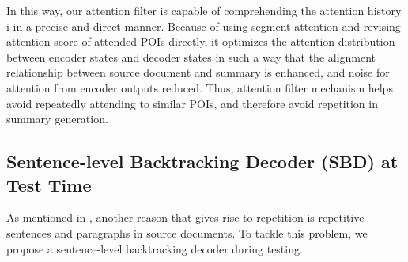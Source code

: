 
In this way, our attention filter is capable of comprehending the attention history i
in a precise and direct manner. 
Because of using segment attention and revising attention score of attended POIs directly,
it optimizes the 
attention distribution between encoder states and decoder states in such a way that
the alignment relationship between source document and summary is enhanced, and noise for attention from encoder outputs reduced. 
Thus, attention filter mechanism helps avoid repeatedly attending to similar POIs, and therefore avoid repetition in summary generation.


\subsection{Sentence-level Backtracking Decoder (SBD) at Test Time}

As mentioned in , another reason that gives rise to repetition is repetitive sentences and paragraphs in source documents.
To tackle this problem, we propose a sentence-level backtracking decoder during testing.

